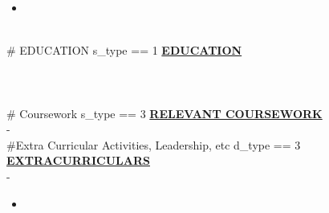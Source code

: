 \documentclass{article}
\begin{document}
\begin{itemize}[noitemsep,nolistsep,leftmargin=*]
    \item {}
\end{itemize}
        ~\\
\#{ EDUCATION s_type == 1 }
\noindent \textbf{\underline{EDUCATION}} \\
\textbf{} \\
 \hfill {} \\
\textit{}\\
\#{ Coursework s_type == 3 }
\noindent \textbf{\underline{RELEVANT COURSEWORK}}\\
\textbf{} - \\
\#{Extra Curricular Activities, Leadership, etc d_type == 3}
\noindent \textbf{\underline{EXTRACURRICULARS}} \\
\noindent \textbf{} \hfill {} -  %
\begin{itemize}[noitemsep,nolistsep,leftmargin=*]
    \item {}
\end{itemize}
        ~\\
\end{document}
